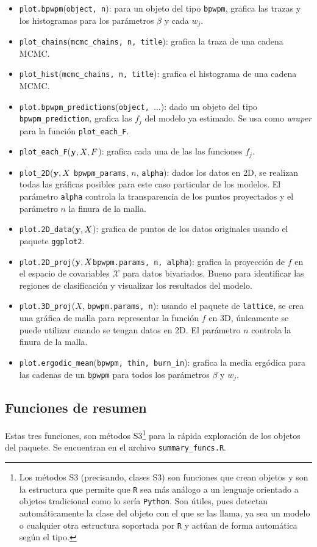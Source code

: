 \documentclass[../../Main/Main.tex]{subfiles}
\begin{document}
\begin{itemize}[label = {}]
	\item \verb|plot.bpwpm|(\verb|object, n|): para un objeto del tipo \verb|bpwpm|, grafica las trazas y los histogramas para los parámetros $\beta$ y cada $w_j$. 
	\item \verb|plot_chains|(\verb|mcmc_chains, n, title|): grafica la traza de una cadena MCMC.
	\item \verb|plot_hist|(\verb|mcmc_chains, n, title|): grafica el histograma de una cadena MCMC.  
	\item \verb|plot.bpwpm_predictions|(\verb|object, |$\ldots$): dado un objeto del tipo \verb|bpwpm_prediction|, grafica las $f_j$ del modelo ya estimado. Se usa como \textit{wraper} para la función \verb|plot_each_F|. 
	\item \verb|plot_each_F|($\mathbf{y}, X, F$): grafica cada una de las las funciones $f_j$. 
	\item \verb|plot_2D|($\mathbf{y}, X$ \verb|bpwpm_params|, $n$, \verb|alpha|): dados los datos en 2D, se realizan todas las gráficas posibles para este caso particular de los modelos. El parámetro \verb|alpha| controla la transparencia de los puntos proyectados y el parámetro $n$ la finura de la malla. 
	\item \verb|plot.2D_data|($\mathbf{y}, X$): grafica de puntos de los datos originales usando el paquete \verb|ggplot2|.
	\item \verb|plot.2D_proj|($\mathbf{y}, X$\verb|bpwpm.params, n, alpha|): grafica la proyección de $f$ en el espacio de covariables $\mathcal{X}$ para datos bivariados. Bueno para identificar las regiones de clasificación y visualizar los resultados del modelo.
	\item \verb|plot.3D_proj|($X$, \verb|bpwpm.params, n|): usando el paquete de \verb|lattice|, se crea una gráfica de malla para representar la función $f$ en 3D, únicamente se puede utilizar cuando se tengan datos en 2D. El parámetro $n$ controla la finura de la malla. 
	\item \verb|plot.ergodic_mean|(\verb|bpwpm, thin, burn_in|): grafica la media ergódica para las cadenas de un \verb|bpwpm| para todos los parámetros $\beta$ y $w_j$.
\end{itemize}

\subsection*{Funciones de resumen}
Estas tres funciones, son métodos S3\footnote{Los métodos S3 (precisando, clases S3) son funciones que crean objetos y son la estructura que permite que \texttt{R} sea más análogo a un lenguaje orientado a objetos tradicional como lo sería \texttt{Python}. Son útiles, pues detectan automáticamente la clase del objeto con el que se las llama, ya sea un modelo o cualquier otra estructura soportada por \texttt{R} y actúan de forma automática según el tipo.} para la rápida exploración de los objetos del paquete. Se encuentran en el archivo \verb|summary_funcs.R|.
\end{document}
